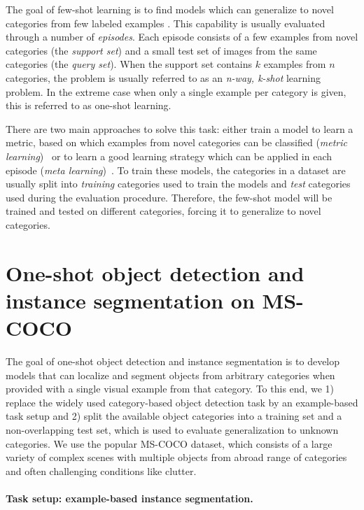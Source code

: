 \documentclass{article}
\newcommand{\coco}{MS-COCO\xspace}
\begin{document}
The goal of few-shot learning is to find models which can generalize to novel categories from few labeled examples \cite{FeiFei2006, Lake2015}. This capability is usually evaluated through a number of \emph{episodes}. Each episode consists of a few examples from novel categories (the \emph{support set}) and a small test set of images from the same categories (the \emph{query set}). When the support set contains $k$ examples from $n$ categories, the problem is usually referred to as an \emph{n-way, k-shot} learning problem. In the extreme case when only a single example per category is given, this is referred to as one-shot learning.

There are two main approaches to solve this task: either train a model to learn a metric, based on which examples from novel categories can be classified (\emph{metric learning})~\cite{Koch2015, Vinyals2016, Snell2017, Wang2018} or to learn a good learning strategy which can be applied in each episode (\emph{meta learning})~\cite{Finn2017, Li2017a, Munkhdalai2017, Munkhdalai2018, Sung2018, Ren2018, Sun2019, Rusu2018}. To train these models, the categories in a dataset are usually split into \emph{training} categories used to train the models and \emph{test} categories used during the evaluation procedure. Therefore, the few-shot model will be trained and tested on different categories, forcing it to generalize to novel categories.


\section{One-shot object detection and instance segmentation on \coco }
\label{sec:task}

The goal of one-shot object detection and instance segmentation is to develop models that can localize and segment objects from arbitrary categories when provided with a single visual example from that category. To this end, we 1) replace the widely used category-based object detection task by an example-based task setup and 2) split the available object categories into a training set and a non-overlapping test set, which is used to evaluate generalization to unknown categories. We use the popular \coco dataset, which consists of a large variety of complex scenes with multiple objects from abroad range of categories and often challenging conditions like clutter.

\paragraph{Task setup: example-based instance segmentation.}
\end{document}
